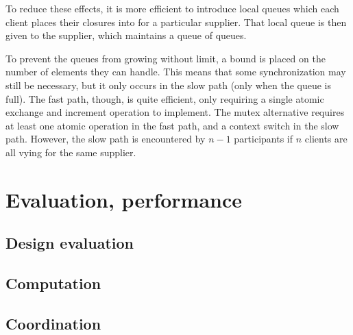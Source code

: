 \documentclass[a4]{article}
\begin{document}
To reduce these effects,
it is more efficient to introduce local queues which each client
places their closures into for a particular supplier.
That local queue is then given to the supplier,
which maintains a queue of queues.
\begin{center}
\end{center}
To prevent the queues from growing without limit,
a bound is placed on the number of elements they can handle.
This means that some synchronization may still be necessary,
but it only occurs in the slow path (only when the queue is full).
The fast path, though, is quite efficient,
only requiring a single atomic exchange and increment operation
to implement.
The mutex alternative requires at least one atomic operation in the fast path,
and a context switch in the slow path.
However, the slow path is encountered by $n - 1$ participants if
$n$ clients are all vying for the same supplier.

\section{Evaluation, performance}

\subsection{Design evaluation}

\subsection{Computation}

\subsection{Coordination}

\end{document}

